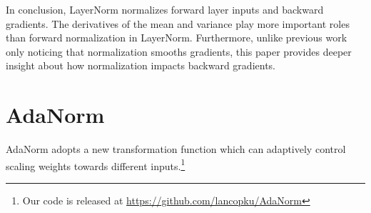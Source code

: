\documentclass{article}
\begin{document}
In conclusion,  LayerNorm normalizes forward layer inputs and backward gradients. The derivatives of the mean and variance play more important roles than forward normalization in LayerNorm. Furthermore, unlike previous work~\citep{santurkar2018does} only noticing that normalization smooths gradients, this paper provides deeper insight about how normalization impacts backward gradients. 

























\begin{table}[h]
\small
\setlength{\tabcolsep}{3pt}
\centering
  \caption{The derivative of variance is more important than that of mean for deeper networks. ``(+)'' means higher is better. ``(-)'' means lower is better. }

  \label{tab:meanorvariance}
  \end{table}
 


 




 \section{AdaNorm}
AdaNorm adopts a new transformation function which can adaptively control scaling weights towards different inputs.\footnote{Our code is released at \url{https://github.com/lancopku/AdaNorm}}
\end{document}
